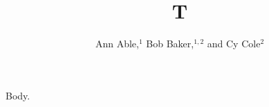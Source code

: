 \documentclass{ws-procs9x6}
\begin{document}
\title{T}
\author{Ann Able,$^1$ Bob Baker,$^{1,2}$ and Cy Cole$^2$}
\address{$^1$Univ A, Town A\\ $^2$Univ B, Town B}
\bodymatter
Body.
\end{document}
